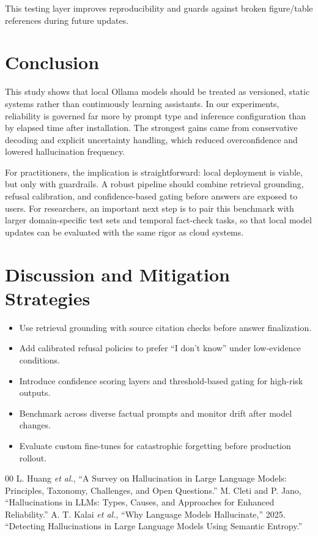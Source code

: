 \documentclass[conference]{IEEEtran}
\begin{document}
This testing layer improves reproducibility and guards against broken figure/table references during future updates.

\section{Conclusion}
This study shows that local Ollama models should be treated as versioned, static systems rather than continuously learning assistants. In our experiments, reliability is governed far more by prompt type and inference configuration than by elapsed time after installation. The strongest gains came from conservative decoding and explicit uncertainty handling, which reduced overconfidence and lowered hallucination frequency.

For practitioners, the implication is straightforward: local deployment is viable, but only with guardrails. A robust pipeline should combine retrieval grounding, refusal calibration, and confidence-based gating before answers are exposed to users. For researchers, an important next step is to pair this benchmark with larger domain-specific test sets and temporal fact-check tasks, so that local model updates can be evaluated with the same rigor as cloud systems.

\section{Discussion and Mitigation Strategies}
\begin{itemize}
    \item Use retrieval grounding with source citation checks before answer finalization.
    \item Add calibrated refusal policies to prefer ``I don't know'' under low-evidence conditions.
    \item Introduce confidence scoring layers and threshold-based gating for high-risk outputs.
    \item Benchmark across diverse factual prompts and monitor drift after model changes.
    \item Evaluate custom fine-tunes for catastrophic forgetting before production rollout.
\end{itemize}

\begin{thebibliography}{00}
 L. Huang \textit{et al.}, ``A Survey on Hallucination in Large Language Models: Principles, Taxonomy, Challenges, and Open Questions.''
 M. Cleti and P. Jano, ``Hallucinations in LLMs: Types, Causes, and Approaches for Enhanced Reliability.''
 A. T. Kalai \textit{et al.}, ``Why Language Models Hallucinate,'' 2025.
 ``Detecting Hallucinations in Large Language Models Using Semantic Entropy.''
\end{thebibliography}
\end{document}
